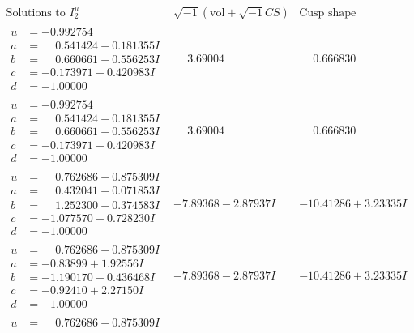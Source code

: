 \documentclass[1p]{elsarticle_modified}
\theoremstyle{definition}
\newcommand{\I}{\sqrt{-1}}
\begin{document}
$$\begin{array}{c|c|c}  
\text{Solutions to }I^u_{2}& \I (\text{vol} + \sqrt{-1}CS) & \text{Cusp shape}\\
 \hline 
\begin{aligned}
u &= -0.992754\phantom{ +0.000000I} \\
a &= \phantom{-}0.541424 + 0.181355 I \\
b &= \phantom{-}0.660661 - 0.556253 I \\
c &= -0.173971 + 0.420983 I \\
d &= -1.00000\phantom{ +0.000000I}\end{aligned}
 & \phantom{-}3.69004\phantom{ +0.000000I} & \phantom{-}0.666830\phantom{ +0.000000I} \\ \hline\begin{aligned}
u &= -0.992754\phantom{ +0.000000I} \\
a &= \phantom{-}0.541424 - 0.181355 I \\
b &= \phantom{-}0.660661 + 0.556253 I \\
c &= -0.173971 - 0.420983 I \\
d &= -1.00000\phantom{ +0.000000I}\end{aligned}
 & \phantom{-}3.69004\phantom{ +0.000000I} & \phantom{-}0.666830\phantom{ +0.000000I} \\ \hline\begin{aligned}
u &= \phantom{-}0.762686 + 0.875309 I \\
a &= \phantom{-}0.432041 + 0.071853 I \\
b &= \phantom{-}1.252300 - 0.374583 I \\
c &= -1.077570 - 0.728230 I \\
d &= -1.00000\phantom{ +0.000000I}\end{aligned}
 & -7.89368 - 2.87937 I & -10.41286 + 3.23335 I \\ \hline\begin{aligned}
u &= \phantom{-}0.762686 + 0.875309 I \\
a &= -0.83899 + 1.92556 I \\
b &= -1.190170 - 0.436468 I \\
c &= -0.92410 + 2.27150 I \\
d &= -1.00000\phantom{ +0.000000I}\end{aligned}
 & -7.89368 - 2.87937 I & -10.41286 + 3.23335 I \\ \hline\begin{aligned}
u &= \phantom{-}0.762686 - 0.875309 I \\

\end{aligned}
\end{array}$$
\end{document}
